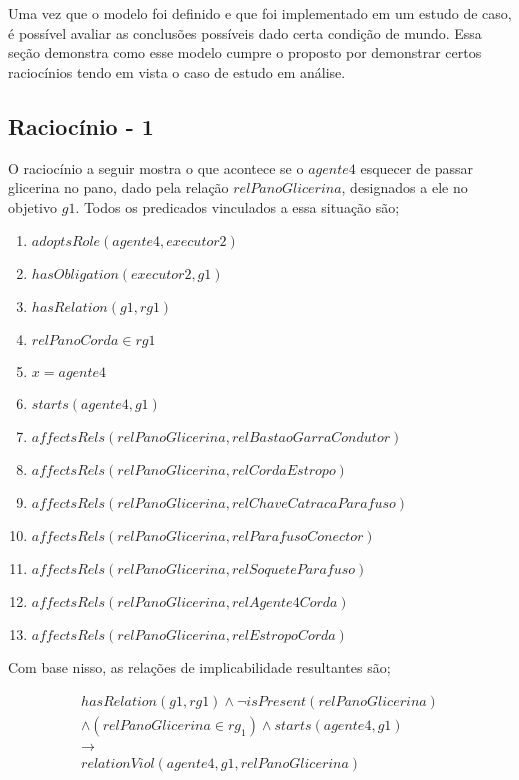 \label{racs}

Uma vez que o modelo foi definido e que foi implementado em um estudo de caso, é possível avaliar as conclusões possíveis dado certa condição de mundo. Essa seção demonstra como esse modelo cumpre o proposto por demonstrar certos raciocínios tendo em vista o caso de estudo em análise. 

\subsection{Raciocínio - 1} 
\label{raciocinio1}

O raciocínio a seguir mostra o que acontece se o $agente4$ esquecer de passar glicerina no pano, dado pela relação $relPanoGlicerina$, designados a ele no objetivo $g1$. 
Todos os predicados vinculados a essa situação são;

\begin{enumerate}
	\item $adoptsRole(agente4,executor2)$ 
	\item $hasObligation(executor2,g1)$
	\item $hasRelation(g1,rg1)$ 
	\item $relPanoCorda \in rg1$
	\item $ x = agente4 $
	\item $starts(agente4,g1)$
	\item $affectsRels(relPanoGlicerina,relBastaoGarraCondutor)$
	\item $affectsRels(relPanoGlicerina,relCordaEstropo)$  
	\item $affectsRels(relPanoGlicerina,relChaveCatracaParafuso)$
	\item $affectsRels(relPanoGlicerina,relParafusoConector)$ 
	\item $affectsRels(relPanoGlicerina,relSoqueteParafuso)$ 
	\item $affectsRels(relPanoGlicerina,relAgente4Corda)$ 
	\item $affectsRels(relPanoGlicerina,relEstropoCorda)$	
\end{enumerate}

Com base nisso, as relações de implicabilidade resultantes são;

\begin{eqnarray}\nonumber
	hasRelation(g1,rg1)\wedge \neg isPresent(relPanoGlicerina)  \nonumber \\ 
	\wedge (relPanoGlicerina\in rg_1) \wedge starts(agente4,g1) \nonumber \\ 
	\to \nonumber \\ 
	relationViol(agente4,g1,relPanoGlicerina) \nonumber \\	
\end{eqnarray}

